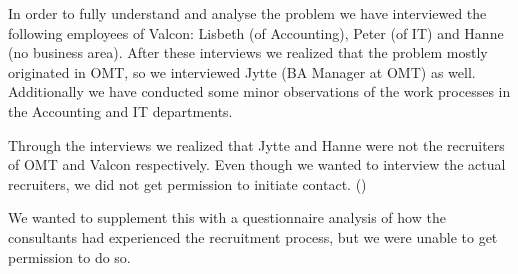 In order to fully understand and analyse the problem we have interviewed the following employees of Valcon:
Lisbeth (of Accounting), Peter (of IT) and Hanne (no business area).
After these interviews we realized that the problem mostly originated in OMT, so we interviewed Jytte (BA Manager at OMT) as well.
Additionally we have conducted some minor observations of the work processes in the Accounting and IT departments.

Through the interviews we realized that Jytte and Hanne were not the recruiters of OMT and Valcon respectively.
Even though we wanted to interview the actual recruiters, we did not get permission to initiate contact. ()

We wanted to supplement this with a questionnaire analysis of how the consultants had experienced the recruitment process, but we were unable to get permission to do so.
